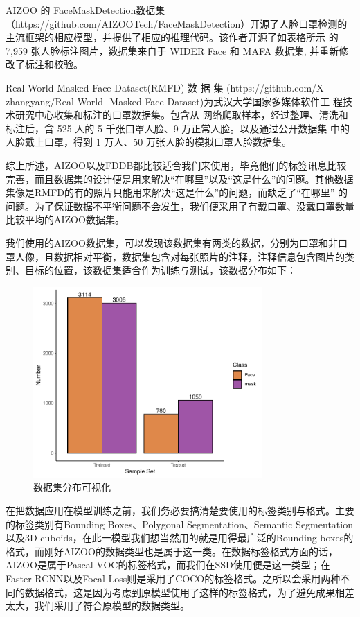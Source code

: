\documentclass[journal,transmag]{IEEEtran}
\begin{document}
AIZOO 的 FaceMaskDetection数据集（https://github.com/AIZOOTech/FaceMaskDetection）开源了人脸口罩检测的主流框架的相应模型，并提供了相应的推理代码。该作者开源了如表格所示 的 7,959 张人脸标注图片，数据集来自于 WIDER Face 和 MAFA 数据集, 并重新修改了标注和校验。

Real-World Masked Face Dataset(RMFD) 数 据 集 (https://github.com/X-zhangyang/Real-World- Masked-Face-Dataset)为武汉大学国家多媒体软件工 程技术研究中心收集和标注的口罩数据集。包含从 网络爬取样本，经过整理、清洗和标注后，含 525 人的 5 千张口罩人脸、9 万正常人脸。以及通过公开数据集 中的人脸戴上口罩，得到 1 万人、50 万张人脸的模拟口罩人脸数据集。

综上所述，AIZOO以及FDDB都比较适合我们来使用，毕竟他们的标签讯息比较完善，而且数据集的设计便是用来解决“在哪里”以及“这是什么”的问题。其他数据集像是RMFD的有的照片只能用来解决“这是什么”的问题，而缺乏了“在哪里” 的问题。为了保证数据不平衡问题不会发生，我们便采用了有戴口罩、没戴口罩数量比较平均的AIZOO数据集。

我们使用的AIZOO数据集，可以发现该数据集有两类的数据，分别为口罩和非口罩人像，且数据相对平衡，数据集包含对每张照片的注释，注释信息包含图片的类别、目标的位置，该数据集适合作为训练与测试，该数据分布如下：
\begin{figure}[h]
\centering
\includegraphics[width=3.44in]{Dataset.pdf}
\caption{数据集分布可视化}
\end{figure}

在把数据应用在模型训练之前，我们务必要搞清楚要使用的标签类别与格式。主要的标签类别有Bounding Boxes、Polygonal Segmentation、Semantic Segmentation以及3D cuboids，在此一模型我们想当然用的就是用得最广泛的Bounding boxes的格式，而刚好AIZOO的数据类型也是属于这一类。在数据标签格式方面的话，AIZOO是属于Pascal VOC的标签格式，而我们在SSD使用便是这一类型；在Faster RCNN以及Focal Loss则是采用了COCO的标签格式。之所以会采用两种不同的数据格式，这是因为考虑到原模型使用了这样的标签格式，为了避免成果相差太大，我们采用了符合原模型的数据类型。
\end{document}
